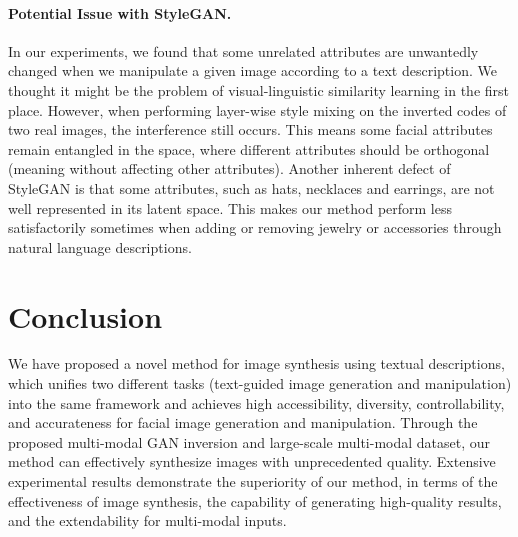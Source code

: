 \documentclass[final]{cvpr}
\begin{document}
\vspace{-5pt}
\paragraph{Potential Issue with StyleGAN.}
In our experiments, we found that some unrelated attributes are unwantedly changed when we manipulate a given image according to a text description.
We thought it might be the problem of visual-linguistic similarity learning in the first place. 
However, when performing layer-wise style mixing on the inverted codes of two real images, the interference still occurs.
This means some facial attributes remain entangled in the  space, where different attributes should be orthogonal (meaning without affecting other attributes).
Another inherent defect of StyleGAN is that some attributes, such as hats, necklaces and earrings, are not well represented in its latent space. This makes our method perform less satisfactorily sometimes when adding or removing jewelry or accessories through natural language descriptions.

\section{Conclusion}
\label{sec:conclusion}
We have proposed a novel method for image synthesis using textual descriptions, which unifies two different tasks (text-guided image generation and manipulation) into the same framework and achieves high accessibility, diversity, controllability, and accurateness for facial image generation and manipulation.
Through the proposed multi-modal GAN inversion and large-scale multi-modal dataset, our method can effectively synthesize images with unprecedented quality.
Extensive experimental results demonstrate the superiority of our method, in terms of the effectiveness of image synthesis, the capability of generating high-quality results, and the extendability for multi-modal inputs.


{\small


}
\end{document}

